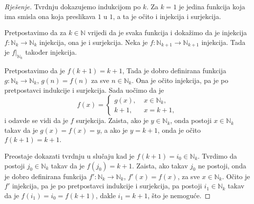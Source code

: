 \begin{proof}[Rješenje]
Tvrdnju dokazujemo indukcijom po \(k\). Za \(k=1\) je jedina funkcija koja ima smisla ona koja preslikava \(1\) u \(1\), a ta je očito i injekcija i surjekcija.

Pretpostavimo da za \(k\in \mathbb{N}\) vrijedi da je svaka funkcija  i dokažimo da je injekcija \(f : \mathbb{N}_k\to \mathbb{N}_k\) injekcija, ona je i surjekcija. Neka je \(f : \mathbb{N}_{k+1}\to \mathbb{N}_{k+1}\) injekcija. Tada je \(f|_{\mathbb{N}_k}\) također injekcija. 

Pretpostavimo da je \(f(k+1)=k+1\), Tada je dobro definirana funkcija \(g : \mathbb{N}_k\to \mathbb{N}_k\), \(g(n)=f(n)\) za sve \(n\in \mathbb{N}_k\). Ona je očito injekcija, pa je po pretpostavci indukcije i surjekcija. Sada uočimo da je
\[f(x)=\begin{cases}
g(x), &\;x\in \mathbb{N}_k,\\
k+1, &\; x=k+1,
\end{cases}\]
i odavde se vidi da je \(f\) surjekcija. Zaista, ako je \(y\in \mathbb {N}_k\), onda postoji \(x\in \mathbb{N}_k\) takav da je \(g(x)=f(x)=y\), a ako je \(y=k+1\), onda je očito \(f(k+1)=k+1\).

Preostaje dokazati tvrdnju u slučaju kad je \(f(k+1)=i_0\in \mathbb{N}_k\). Tvrdimo da postoji \(j_0\in \mathbb{N}_k\) takav da je \(f(j_0)=k+1\). Zaista, ako takav \(j_0\) ne postoji, onda je dobro definirana funkcija \(f' : \mathbb{N}_k\to \mathbb{N}_k\), \(f'(x)=f(x)\), za sve \(x\in \mathbb{N}_k\). Očito je \(f'\) injekcija, pa je po pretpostavci indukcije i surjekcija, pa postoji \(i_1\in \mathbb{N}_k\) takav da je \(f(i_1)=i_0=f(k+1)\), dakle \(i_1=k+1\), što je nemoguće.


\end{proof}
